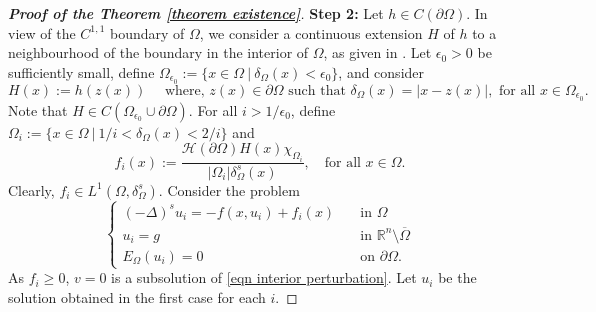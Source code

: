 \documentclass{amsart}
\newcommand{\R}{\mathbb{R}}
\newcommand{\slap}{(-\Delta)^{s}}
\begin{document}
\begin{proof}[\textbf{Proof of the Theorem \ref{theorem existence}}]
    \textbf{Step 2:}
    Let $h\in C(\partial\Omega)$. In view of the $C^{1,1}$ boundary of $\Omega$, we consider a continuous extension $H$ of $h$ to a neighbourhood of the boundary in the interior of $\Omega$, as given in \cite[Theorem 4.6 and Remark 3.1]{AbatangeloVazquez2023}. Let $\epsilon_{0}>0$ be sufficiently small, define $\Omega_{\epsilon_{0}}:=\{x\in \Omega~|~ \delta_{\Omega}(x)<\epsilon_{0}\}$, and consider 
    \begin{equation*}
        H(x):=h(z(x))\quad  \text{ where, } z(x)\in \partial\Omega \text{ such that } \delta_{\Omega}(x)=|x-z(x)|, \text{ for all } x\in \Omega_{\epsilon_{0}}.
    \end{equation*}
    Note that $H\in C(\Omega_{\epsilon_{0}}\cup \partial\Omega)$. For all $i>1/\epsilon_{0}$, define $\Omega_{i}:=\{x\in \Omega~|~ 1/i<\delta_{\Omega}(x)<2/i\}$ and 
    \begin{equation}\label{eqn dfn of fi}
        f_{i}(x):=\frac{\mathcal{H}(\partial\Omega)H(x)\chi_{\Omega_{i}}}{|\Omega_{i}|\delta_{\Omega}^{s}(x)}, \quad \text{for all } x\in \Omega.
    \end{equation}
    Clearly, $f_{i}\in L^{1}(\Omega,\delta_{\Omega}^{s})$. Consider the problem 
    \begin{equation}\label{eqn interior perturbation}
         \begin{cases}
         \slap u_{i}=-f(x,u_{i})+f_{i}(x)\quad &\text{in } \Omega\\
         u_{i}=g &\text{in }\R^{n}\setminus\overline{\Omega}\\
         E_{\Omega}(u_{i})=0 &\text{on }\partial\Omega.
    \end{cases}
    \end{equation}
    As $f_{i}\geq 0$, $v=0$ is a subsolution of \eqref{eqn interior perturbation}. Let $u_{i}$ be the solution obtained in the first case for each $i$. 
    

\end{proof}
\end{document}

